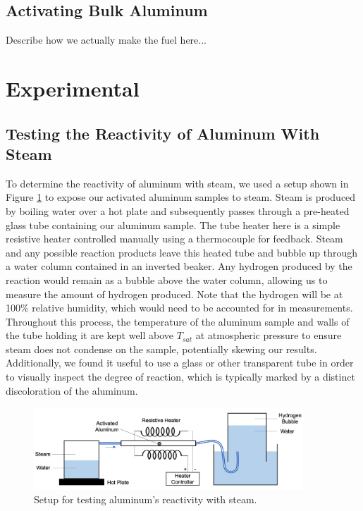 \documentclass[preprint,12pt,3p]{elsarticle}
\begin{document}
\subsection{Activating Bulk Aluminum}

Describe how we actually make the fuel here...

\section{Experimental}
\label{experimental}

\subsection{Testing the Reactivity of Aluminum With Steam}

To determine the reactivity of aluminum with steam, we used a setup shown in
Figure \ref{fig:steam_test_setup} to expose our activated aluminum samples to
steam. Steam is produced by boiling water over a hot plate and subsequently
passes through a pre-heated glass tube containing our aluminum sample. The tube
heater here is a simple resistive heater controlled manually using a
thermocouple for feedback. Steam and any possible reaction products leave this
heated tube and bubble up through a water column contained in an inverted
beaker. Any hydrogen produced by the reaction would remain as a bubble above the
water column, allowing us to measure the amount of hydrogen produced. Note that
the hydrogen will be at 100\% relative humidity, which would need to be
accounted for in measurements.  Throughout this process, the temperature of the
aluminum sample and walls of the tube holding it are kept well above $T_{sat}$
at atmospheric pressure to ensure steam does not condense on the sample,
potentially skewing our results.  Additionally, we found it useful to use a
glass or other transparent tube in order to visually inspect the degree of
reaction, which is typically marked by a distinct discoloration of the aluminum.

\begin{figure}
  \centering
  \includegraphics[width=0.9\textwidth]{fig/steam_test_setup_ss}
  \caption{Setup for testing aluminum's reactivity with steam.}
  \label{fig:steam_test_setup}
\end{figure}
\end{document}
